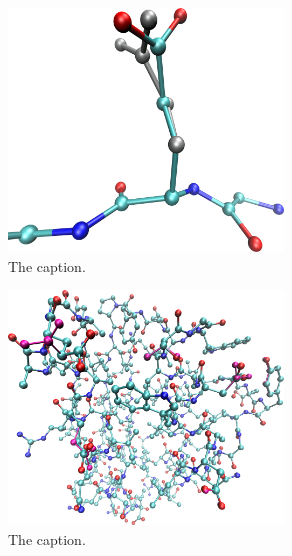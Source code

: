 \begin{figure}[h]
  \centering
  \includegraphics[width=0.65\textwidth,height=0.3\textheight,keepaspectratio]{figures/mutation_side_chain_images/1brs_chain_a_73.png}
  \caption{The caption.}
  \label{figure:computational_mutation_scanning/figname}
\end{figure}
\clearpage 
\begin{figure}[h]
  \centering
  \includegraphics[width=0.65\textwidth,height=0.3\textheight,keepaspectratio]{figures/mutation_side_chain_images/1brs_all.png}
  \caption{The caption.}
  \label{figure:computational_mutation_scanning/figname}
\end{figure}

